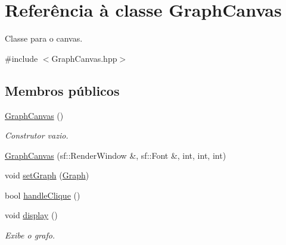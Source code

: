 \hypertarget{classGraphCanvas}{}\section{Referência à classe Graph\+Canvas}
\label{classGraphCanvas}


Classe para o canvas.  




{\ttfamily \#include $<$Graph\+Canvas.\+hpp$>$}

\subsection*{Membros públicos}
\begin{DoxyCompactItemize}
\item 
\mbox{\label{classGraphCanvas_a0868eb47bb561e5037b24dc06fad52c7}} 
\mbox{\hyperlink{classGraphCanvas_a0868eb47bb561e5037b24dc06fad52c7}{Graph\+Canvas}} ()
\begin{DoxyCompactList}\small\item\em Construtor vazio. \end{DoxyCompactList}\item 
\mbox{\hyperlink{classGraphCanvas_a7852754f721735c6d8672673a50401cc}{Graph\+Canvas}} (sf\+::\+Render\+Window \&, sf\+::\+Font \&, int, int, int)
\item 
void \mbox{\hyperlink{classGraphCanvas_a1f402e85859d1eb3b6f1965de3def1af}{set\+Graph}} (\mbox{\hyperlink{classGraph}{Graph}})
\item 
bool \mbox{\hyperlink{classGraphCanvas_a4115aea20f2f1352b674ef9cfb6579a4}{handle\+Clique}} ()
\item 
\mbox{\label{classGraphCanvas_a236523bfec7a55f8ea70c09fdb3590c3}} 
void \mbox{\hyperlink{classGraphCanvas_a236523bfec7a55f8ea70c09fdb3590c3}{display}} ()
\begin{DoxyCompactList}\small\item\em Exibe o grafo. \end{DoxyCompactList}\end{DoxyCompactItemize}

